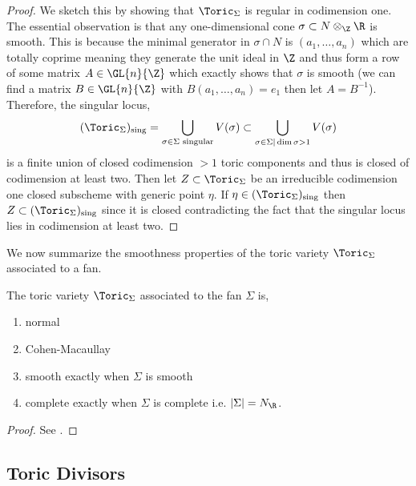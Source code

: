 \begin{proof}
We sketch this by showing that $\Toric_\Sigma$ is regular in codimension one. The essential observation is that any one-dimensional cone $\sigma \subset N \otimes_\Z \R$ is smooth. This is because the minimal generator in $\sigma \cap N$ is $(a_1, \dots, a_n)$ which are totally coprime meaning they generate the unit ideal in $\Z$ and thus form a row of some matrix $A \in \GL{n}{\Z}$ which exactly shows that $\sigma$ is smooth (we can find a matrix $B \in \GL{n}{\Z}$ with $B (a_1, \dots, a_n) = e_1$ then let $A = B^{-1}$). Therefore, the singular locus,
\[ (\Toric_\Sigma)_{\text{sing}} = \bigcup_{\sigma \in \Sigma \text{ singular}} V(\sigma) \subset \bigcup_{\sigma \in \Sigma | \dim{\sigma} > 1} V(\sigma) \]
is a finite union of closed codimension $>1$ toric components and thus is closed of codimension at least two. Then let $Z \subset \Toric_\Sigma$ be an irreducible codimension one closed subscheme with generic point $\eta$. If $\eta \in (\Toric_\Sigma)_{\text{sing}}$ then $Z \subset (\Toric_\Sigma)_{\text{sing}}$ since it is closed contradicting the fact that the singular locus lies in codimension at least two.
\end{proof}
\noindent
We now summarize the smoothness properties of the toric variety $\Toric_\Sigma$ associated to a fan.

\begin{theorem}
The toric variety $\Toric_\Sigma$ associated to the fan $\Sigma$   is,
\begin{enumerate}
\item normal
\item Cohen-Macaullay
\item smooth exactly when $\Sigma$ is smooth
\item complete exactly when $\Sigma$ is complete i.e. $|\Sigma| = N_\R$. 
\end{enumerate}
\end{theorem}

\begin{proof}
See \cite[Lec. 2, Thm. 2.3]{cox_lectures}.
\end{proof}

\subsection{Toric Divisors}


